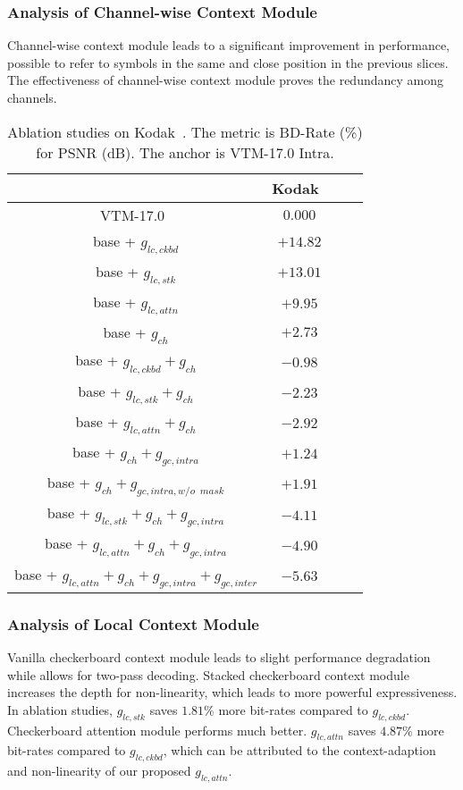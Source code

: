 \documentclass[sigconf]{acmart}
\begin{document}
\subsubsection{Analysis of Channel-wise Context Module}
Channel-wise context module leads to a significant improvement in performance,
possible to refer to symbols in the same and close position in the previous slices.
The effectiveness of channel-wise context module proves the redundancy among channels.
\begin{table}
  \centering
  \footnotesize
  \begin{tabular}{cccc}
  \toprule
               & Kodak~\cite{kodak}    \\ \midrule
          VTM-17.0~\cite{vtm2019} & $0.000$ \\\midrule
          base + $g_{lc,ckbd}$ & $+14.82$ \\\midrule
          base + $g_{lc,stk}$ & $+13.01$ \\\midrule
          base + $g_{lc,attn}$ & $+9.95$ \\\midrule
          base + $g_{ch}$ & $+2.73$ \\\midrule
          base + $g_{lc,ckbd} + g_{ch}$   & $-0.98$ \\\midrule
          base + $g_{lc,stk} + g_{ch}$   & $-2.23$ \\\midrule
          base + $g_{lc,attn} + g_{ch}$   & $-2.92$ \\\midrule
          base + $g_{ch} + g_{gc,intra}$   & $+1.24$ \\\midrule
          base + $g_{ch} + g_{gc,intra, w/o\enspace mask}$   & $+1.91$ \\\midrule
          base + $g_{lc,stk} + g_{ch} + g_{gc,intra}$ & $-4.11$ \\\midrule
          base + $g_{lc,attn} + g_{ch} + g_{gc,intra}$ & $-4.90$  \\\midrule
          base + $g_{lc,attn} + g_{ch} + g_{gc,intra} + g_{gc,inter}$ & $-5.63$ \\\midrule
  \end{tabular}
  \caption{Ablation studies on Kodak~\cite{kodak}.
  The metric is BD-Rate (\%) for PSNR (dB). The anchor is VTM-17.0 Intra.
  }
  \label{tab:ablation}
\end{table}
\subsubsection{Analysis of Local Context Module}
Vanilla checkerboard context module leads to slight performance degradation while
allows for two-pass decoding.
Stacked checkerboard context module increases the depth for non-linearity, which
leads to more powerful expressiveness. In ablation studies, $g_{lc, stk}$
saves $1.81\%$ more bit-rates compared to $g_{lc, ckbd}$.
Checkerboard attention module performs much better. $g_{lc, attn}$
saves $4.87\%$ more bit-rates compared to $g_{lc, ckbd}$,
which can be attributed to the context-adaption and non-linearity of our
proposed $g_{lc, attn}$.
\end{document}
